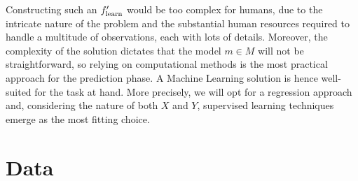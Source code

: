 \documentclass{article}
\newcommand{\flearn}{f'_{\rm learn}}
\begin{document}
Constructing such an $\flearn$ would be too complex for humans, due to the intricate nature of the problem and the substantial human resources required to handle a multitude of observations, each with lots of details. Moreover, the complexity of the solution dictates that the model $m \in M$ will not be straightforward, so relying on computational methods is the most practical approach for the prediction phase. A Machine Learning solution is hence well-suited for the task at hand. More precisely, we will opt for a regression approach and, considering the nature of both $X$ and $Y$, supervised learning techniques emerge as the most fitting choice.

\section{Data}
\label{sec:data}
\end{document}
